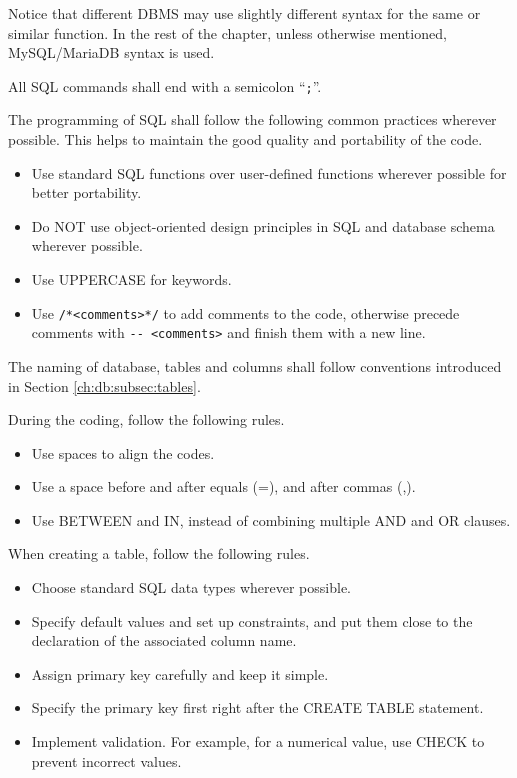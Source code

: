 Notice that different DBMS may use slightly different syntax for the same or similar function. In the rest of the chapter, unless otherwise mentioned, MySQL/MariaDB syntax is used. 

All SQL commands shall end with a semicolon ``\verb|;|''.

The programming of SQL shall follow the following common practices wherever possible. This helps to maintain the good quality and portability of the code.
\begin{itemize}
	\item Use standard SQL functions over user-defined functions wherever possible for better portability.
	\item Do NOT use object-oriented design principles in SQL and database schema wherever possible.
	\item Use UPPERCASE for keywords.
	\item Use \verb|/*<comments>*/| to add comments to the code, otherwise precede comments with \verb|-- <comments>| and finish them with a new line.
\end{itemize}

The naming of database, tables and columns shall follow conventions introduced in Section \ref{ch:db:subsec:tables}.

During the coding, follow the following rules.
\begin{itemize}
	\item Use spaces to align the codes.
	\item Use a space before and after equals (=), and after commas (,).
	\item Use BETWEEN and IN, instead of combining multiple AND and OR clauses.
\end{itemize}

When creating a table, follow the following rules.
\begin{itemize}
	\item Choose standard SQL data types wherever possible.
	\item Specify default values and set up constraints, and put them close to the declaration of the associated column name.
	\item Assign primary key carefully and keep it simple.
	\item Specify the primary key first right after the CREATE TABLE statement.
	\item Implement validation. For example, for a numerical value, use CHECK to prevent incorrect values.
\end{itemize}

